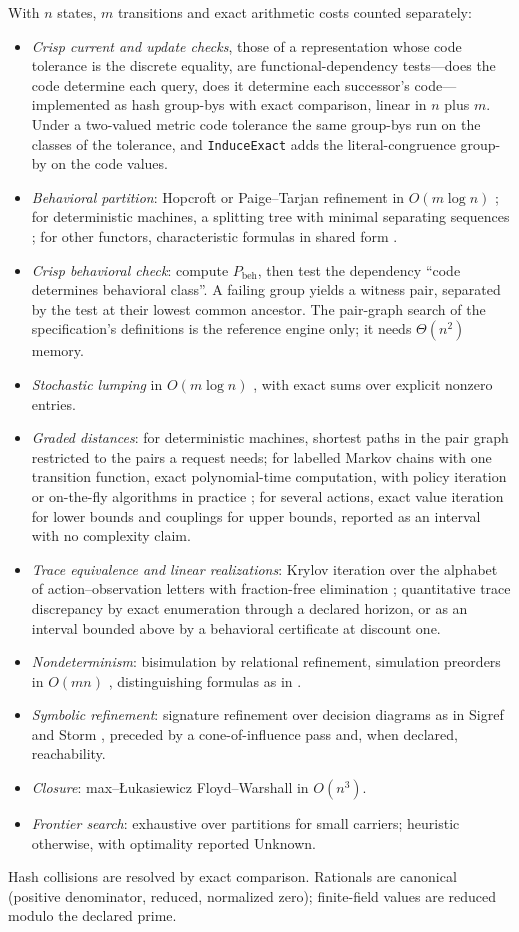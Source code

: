 \documentclass[11pt]{article}
\newcommand{\code}[1]{\texttt{#1}}
\newcommand{\Pbeh}{P_{\mathrm{beh}}}
\begin{document}
With $n$ states, $m$ transitions and exact arithmetic costs counted separately:
\begin{itemize}
\item \emph{Crisp current and update checks}, those of a representation whose code tolerance is the
discrete equality, are functional-dependency tests---does the code determine each query, does it
determine each successor's code---implemented as hash group-bys with exact comparison, linear in $n$
plus $m$. Under a two-valued metric code tolerance the same group-bys run on the classes of the
tolerance, and \code{InduceExact} adds the literal-congruence group-by on the code values.
\item \emph{Behavioral partition}: Hopcroft or Paige--Tarjan refinement in $O(m\log n)$
\cite{hopcroft,paigetarjan}; for deterministic machines, a splitting tree with minimal separating
sequences \cite{smetsers}; for other functors, characteristic formulas in shared form
\cite{explaining}.
\item \emph{Crisp behavioral check}: compute $\Pbeh$, then test the dependency ``code determines
behavioral class''. A failing group yields a witness pair, separated by the test at their lowest
common ancestor. The pair-graph search of the specification's definitions is the reference engine
only; it needs $\Theta(n^2)$ memory.
\item \emph{Stochastic lumping} in $O(m\log n)$ \cite{valmari,derisavi}, with exact sums over explicit
nonzero entries.
\item \emph{Graded distances}: for deterministic machines, shortest paths in the pair graph restricted
to the pairs a request needs; for labelled Markov chains with one transition function, exact
polynomial-time computation, with policy iteration or on-the-fly algorithms in practice
\cite{chenvbw,tangvb,bacci}; for several actions, exact value iteration for lower bounds and couplings
for upper bounds, reported as an interval with no complexity claim.
\item \emph{Trace equivalence and linear realizations}: Krylov iteration over the alphabet of
action--observation letters with fraction-free elimination \cite{tzeng,kiefer}; quantitative trace
discrepancy by exact enumeration through a declared horizon, or as an interval bounded above by a
behavioral certificate at discount one.
\item \emph{Nondeterminism}: bisimulation by relational refinement, simulation preorders in $O(mn)$
\cite{hhk}, distinguishing formulas as in \cite{explaining}.
\item \emph{Symbolic refinement}: signature refinement over decision diagrams as in Sigref and Storm
\cite{sigref,storm}, preceded by a cone-of-influence pass and, when declared, reachability.
\item \emph{Closure}: max--\L{}ukasiewicz Floyd--Warshall in $O(n^3)$.
\item \emph{Frontier search}: exhaustive over partitions for small carriers; heuristic otherwise, with
optimality reported Unknown.
\end{itemize}
Hash collisions are resolved by exact comparison. Rationals are canonical (positive denominator,
reduced, normalized zero); finite-field values are reduced modulo the declared prime.
\end{document}
